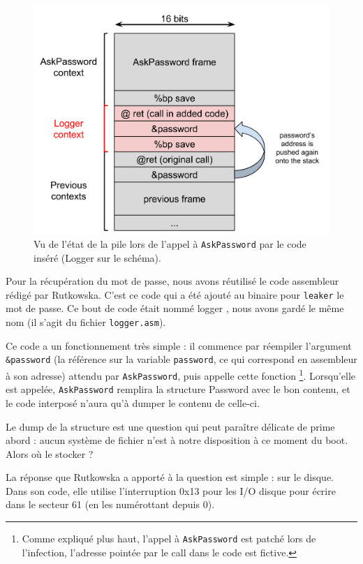 \documentclass[12pt,a4paper]{article}
\begin{document}
\begin{figure}
    \centering
    \includegraphics[height=0.3\textheight]{img/pile_tc.png}
    \caption{Vu de l'état de la pile lors de l'appel à \texttt{AskPassword} par
             le code inséré (Logger sur le schéma).}
    \label{ask_tweak}
\end{figure}

Pour la récupération du mot de passe, nous avons réutilisé le code assembleur
rédigé par Rutkowska. C'est ce code qui a été ajouté au binaire pour
\texttt{leaker} le mot de passe. Ce bout de code était nommé \og logger \fg, nous
avons gardé le même nom (il s'agit du fichier \texttt{logger.asm}).

Ce code a un fonctionnement très simple : il commence par réempiler l'argument
\texttt{\&password} (la référence sur la variable \texttt{password}, ce qui
correspond en assembleur à son adresse) attendu par \texttt{AskPassword}, puis
appelle cette fonction \footnote{Comme expliqué plus haut, l'appel à
\texttt{AskPassword} est patché lors de l'infection, l'adresse pointée par le
call dans le code est fictive.}. Lorsqu'elle est appelée, \texttt{AskPassword}
remplira la structure Password avec le bon contenu, et le code interposé n'aura
qu'à dumper le contenu de celle-ci.

Le dump de la structure est une question qui peut paraître délicate de prime
abord : aucun système de fichier n'est à notre disposition à ce moment du boot.
Alors où le stocker ?

La réponse que Rutkowska a apporté à la question est simple : sur le disque.
Dans son code, elle utilise l'interruption 0x13 pour les I/O disque pour écrire
dans le secteur 61 (en les numérottant depuis 0).
\end{document}
